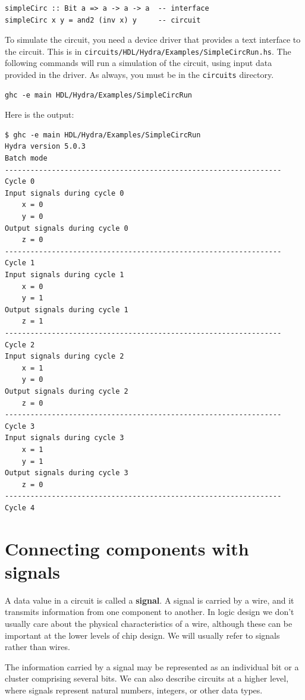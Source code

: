 \documentclass[]{svmono}
\begin{document}
\begin{verbatim}
simpleCirc :: Bit a => a -> a -> a  -- interface
simpleCirc x y = and2 (inv x) y     -- circuit
\end{verbatim}

To simulate the circuit, you need a device driver that provides a
text interface to the circuit.  This is in
\texttt{circuits/HDL/Hydra/Examples/SimpleCircRun.hs}.  The following
commands will run a simulation of the circuit, using input data
provided in the driver.  As always, you must be in the \texttt{circuits}
directory.

\begin{verbatim}
ghc -e main HDL/Hydra/Examples/SimpleCircRun
\end{verbatim}

Here is the output:

\begin{verbatim}
$ ghc -e main HDL/Hydra/Examples/SimpleCircRun
Hydra version 5.0.3
Batch mode
-----------------------------------------------------------------
Cycle 0
Input signals during cycle 0
    x = 0
    y = 0
Output signals during cycle 0
    z = 0
-----------------------------------------------------------------
Cycle 1
Input signals during cycle 1
    x = 0
    y = 1
Output signals during cycle 1
    z = 1
-----------------------------------------------------------------
Cycle 2
Input signals during cycle 2
    x = 1
    y = 0
Output signals during cycle 2
    z = 0
-----------------------------------------------------------------
Cycle 3
Input signals during cycle 3
    x = 1
    y = 1
Output signals during cycle 3
    z = 0
-----------------------------------------------------------------
Cycle 4
\end{verbatim}
\section*{Connecting components with signals}
\label{sec:org3ee6b4a}

A data value in a circuit is called a \textbf{signal}.  A signal is
carried by a wire, and it transmits information from one component
to another.  In logic design we don't usually care about the
physical characteristics of a wire, although these can be
important at the lower levels of chip design.  We will usually
refer to signals rather than wires.

The information carried by a signal may be represented as an
individual bit or a cluster comprising several bits.  We can also
describe circuits at a higher level, where signals represent
natural numbers, integers, or other data types.
\end{document}
